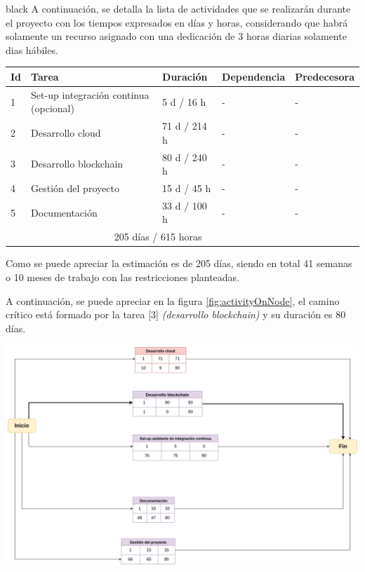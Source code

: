 \documentclass[
11pt, %
]{charter}
\begin{document}
\begin{consigna}{black}
A continuación, se detalla la lista de actividades que se realizarán durante el proyecto con los tiempos expresados en días y horas, considerando que habrá solamente un recurso asignado con una dedicación de 3 horas diarias solamente dias hábiles.

\begin{table}[ht]
\begin{tabularx}{\linewidth}{@{}|l|X|l|l|l|@{}}
\hline
\rowcolor[HTML]{C0C0C0}
Id	& Tarea           						& Duración 	& Dependencia	& Predecesora 	\\ \hline
1	& Set-up integración continua (opcional)	& 5 d / 16 h 		& -        		&  -				\\ \hline
2	& Desarrollo cloud						& 71 d / 214 h		& -				&  -      		\\ \hline
3	& Desarrollo blockchain    				& 80 d / 240 h		& -			 	& -			\\ \hline
4	& Gestión del proyecto 					& 15 d / 45 h		& -				&  - 			\\ \hline
5	& Documentación    						& 33 d / 100 h		& -			 	& -				\\ \hline
\rowcolor[HTML]{C0C0C0}
\multicolumn{2}{|c|}{TOTAL} & \multicolumn{3}{c|}{ 205 días / 615 horas}  \\ \hline
\end{tabularx}
\end{table}


Como se puede apreciar la estimación es de 205 días, siendo en total 41 semanas o 10 meses de trabajo con las restricciones planteadas.

A continuación, se puede apreciar en la figura \ref{fig:activityOnNode}, el camino crítico está formado por la tarea [3] \textit{(desarrollo blockchain)} y su duración es 80 días.

\begin{center}
 \includegraphics[scale=0.30]{./Figuras/activity-on-node}
 \label{fig:activityOnNode}
\end{center}

\end{consigna}
\end{document}
